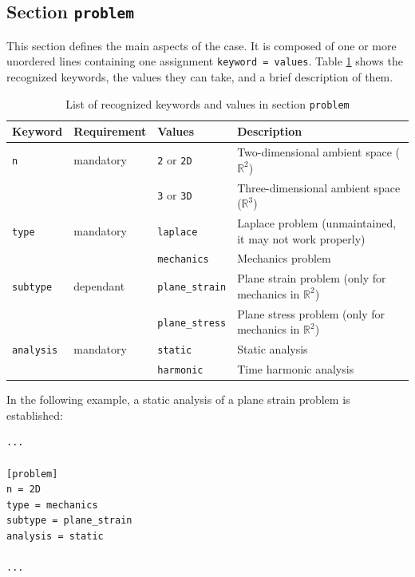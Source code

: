 \documentclass[a4paper,fleqn]{book}
\begin{document}
\subsection{Section \texttt{problem}}
\label{sec:problem}

This section defines the main aspects of the case. It is composed of one or more unordered lines containing one assignment \texttt{keyword = values}. Table \ref{tab:problem} shows the recognized keywords, the values they can take, and a brief description of them.

\begin{table}[h]
\centering
{\footnotesize
\begin{tabular}{llll}
\textbf{Keyword} & \textbf{Requirement} & \textbf{Values} & \textbf{Description} \\
\midrule
\texttt{n} & mandatory & \texttt{2} or \texttt{2D} & Two-dimensional ambient space ($\mathbb{R}^2$)   \\
           &           & \texttt{3} or \texttt{3D} & Three-dimensional ambient space ($\mathbb{R}^3$) \\
\midrule
\texttt{type} & mandatory & \texttt{laplace} & Laplace problem (unmaintained, it may not work properly)     \\
              &           & \texttt{mechanics} & Mechanics problem \\
\midrule
\texttt{subtype} & dependant & \texttt{plane\_strain} & Plane strain problem (only for mechanics in $\mathbb{R}^2$) \\
                 &           & \texttt{plane\_stress} & Plane stress problem (only for mechanics in $\mathbb{R}^2$) \\          
\midrule
\texttt{analysis} & mandatory & \texttt{static}   & Static analysis        \\
                  &           & \texttt{harmonic} & Time harmonic analysis \\    
\end{tabular}
\caption{List of recognized keywords and values in section \texttt{problem}}
\label{tab:problem}
}
\end{table}

In the following example, a static analysis of a plane strain problem is established:
\begin{Verbatim}[frame=single, fontsize=\small, label=input.dat]
...

[problem]
n = 2D
type = mechanics
subtype = plane_strain
analysis = static

...
\end{Verbatim}
\end{document}
